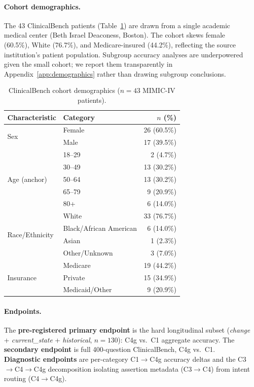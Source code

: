 \paragraph{Cohort demographics.}
The 43 ClinicalBench patients (Table~\ref{tab:demographics}) are drawn from a single academic medical center (Beth Israel Deaconess, Boston).
The cohort skews female (60.5\%), White (76.7\%), and Medicare-insured (44.2\%), reflecting the source institution's patient population.
Subgroup accuracy analyses are underpowered given the small cohort; we report them transparently in Appendix~\ref{app:demographics} rather than drawing subgroup conclusions.

\begin{table}[t]
\centering
\footnotesize
\caption{ClinicalBench cohort demographics ($n=43$ MIMIC-IV patients).}
\label{tab:demographics}
\begin{tabular}{@{}llr@{}}
\toprule
Characteristic & Category & $n$ (\%) \\
\midrule
\multirow{2}{*}{Sex} & Female & 26 (60.5\%) \\
 & Male & 17 (39.5\%) \\
\midrule
\multirow{5}{*}{Age (anchor)} & 18--29 & 2 (4.7\%) \\
 & 30--49 & 13 (30.2\%) \\
 & 50--64 & 13 (30.2\%) \\
 & 65--79 & 9 (20.9\%) \\
 & 80+ & 6 (14.0\%) \\
\midrule
\multirow{4}{*}{Race/Ethnicity} & White & 33 (76.7\%) \\
 & Black/African American & 6 (14.0\%) \\
 & Asian & 1 (2.3\%) \\
 & Other/Unknown & 3 (7.0\%) \\
\midrule
\multirow{3}{*}{Insurance} & Medicare & 19 (44.2\%) \\
 & Private & 15 (34.9\%) \\
 & Medicaid/Other & 9 (20.9\%) \\
\bottomrule
\end{tabular}
\end{table}

\paragraph{Endpoints.}
The \textbf{pre-registered primary endpoint} is the hard longitudinal subset (\textit{change} + \textit{current\_state} + \textit{historical}, $n=130$): C4g vs.\ C1 aggregate accuracy.
The \textbf{secondary endpoint} is full 400-question ClinicalBench, C4g vs.\ C1.
\textbf{Diagnostic endpoints} are per-category C1$\to$C4g accuracy deltas and the C3$\to$C4$\to$C4g decomposition isolating assertion metadata (C3$\to$C4) from intent routing (C4$\to$C4g).

